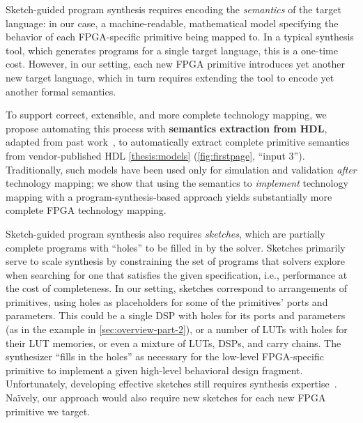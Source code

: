 Sketch-guided program synthesis requires
  encoding the \textit{semantics}
  of the target language:
  in our case,
  a machine-readable,
  mathematical model specifying
  the behavior of each
  FPGA-specific primitive
  being mapped to.
In a typical synthesis tool,
  which generates programs
  for a single target language,
  this is a one-time cost.
However,
  in our setting,
  each new FPGA primitive
  introduces yet another new target language,
  which in turn requires
  extending the tool to encode
  yet another formal semantics.

To support
  correct, extensible, and more complete
  technology mapping, we propose
  automating this process with
  \textbf{semantics extraction from HDL}, 
  adapted from past work~\cite{daly2022synthesizing},
  to automatically extract
  complete primitive semantics
  from vendor-published HDL 
  \cref{thesis:models}
  (\cref{fig:firstpage}, ``input 3'').
Traditionally, such models have
   been used only 
  for
  simulation and validation
  \textit{after} technology mapping;
  we show that using the semantics
  to
  \textit{implement}
  technology mapping
  with a program-synthesis-based approach
  yields substantially more
  complete FPGA technology mapping.

Sketch-guided program synthesis also
  requires \textit{sketches}, which are 
  partially complete programs with ``holes'' to be filled in
  by the solver.
Sketches primarily serve to
  scale synthesis by
  constraining the set of programs that 
  solvers explore when searching for
  one that satisfies
  the given specification,
  i.e., performance at the cost of completeness.
In our setting,
  sketches correspond to
  arrangements of primitives,
  using holes
  as placeholders
  for some of the primitives' 
  ports and parameters.
This could be
  a single DSP with holes for
  its ports and parameters
  (as in the example in \cref{sec:overview-part-2}),
  or a number of LUTs with holes for their LUT memories,
  or even a mixture of LUTs, DSPs, and carry chains.
The synthesizer ``fills in the holes''
  as necessary for
  the low-level FPGA-specific primitive to implement
  a given high-level behavioral design fragment.
Unfortunately,
  developing effective sketches
  still requires synthesis expertise~\cite{10.1145/3140587.3062353,vanGeffenJITSynth}.
  Na\"ively, our approach would also
  require new sketches for each new
  FPGA primitive we target.


